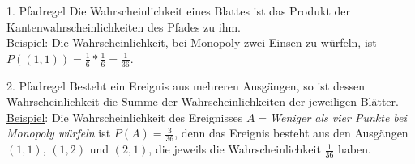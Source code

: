 \begin{bla}{1. Pfadregel}
  Die Wahrscheinlichkeit eines Blattes ist das Produkt der Kantenwahrscheinlichkeiten des Pfades zu ihm.
  \\
  \underline{Beispiel}: Die Wahrscheinlichkeit, bei Monopoly zwei Einsen zu würfeln, ist $P((1,1))=\frac{1}{6}*\frac{1}{6}=\frac{1}{36}$.
\end{bla}

\begin{bla}{2. Pfadregel}
  Besteht ein Ereignis aus mehreren Ausgängen, so ist dessen Wahrscheinlichkeit die Summe der Wahrscheinlichkeiten der jeweiligen Blätter.
  \\
  \underline{Beispiel}: Die Wahrscheinlichkeit des Ereignisses $A=$\emph{Weniger als vier Punkte bei Monopoly würfeln}
  ist $P(A)=\frac{3}{36}$, denn das Ereignis besteht aus den Ausgängen $(1,1)$, $(1,2)$ und $(2,1)$,
  die jeweils die Wahrscheinlichkeit $\frac{1}{36}$ haben.
\end{bla}

